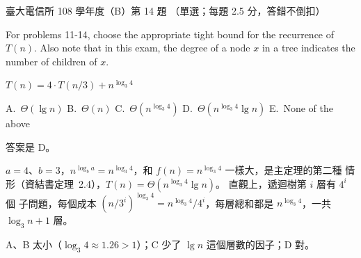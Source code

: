 \begin{pastexam}[label={px:ntu-108-comm-dsab-14}]{臺大電信所 108 學年度（B）第 14 題}
（單選；每題 2.5 分，答錯不倒扣）

For problems 11-14, choose the appropriate tight bound for the recurrence of $T(n)$. Also note
that in this exam, the degree of a node $x$ in a tree indicates the number of children of $x$.

$T(n)=4\cdot T(n/3)+n^{\log_3 4}$

A.~$\Theta(\lg n)$ \qquad B.~$\Theta(n)$ \qquad C.~$\Theta(n^{\log_3 4})$ \qquad
D.~$\Theta(n^{\log_3 4}\lg n)$ \qquad E.~None of the above
\end{pastexam}

\begin{pastsoln}
答案是 D。

$a = 4$、$b = 3$，$n^{\log_b a} = n^{\log_3 4}$，和 $f(n) = n^{\log_3 4}$ 一樣大，是主定理的第二種
情形（資結書定理~2.4），$T(n) = \Theta(n^{\log_3 4} \lg n)$。 直觀上，遞迴樹第 $i$ 層有 $4^i$ 個
子問題，每個成本 $(n/3^i)^{\log_3 4} = n^{\log_3 4} / 4^i$，每層總和都是 $n^{\log_3 4}$，一共
$\log_3 n + 1$ 層。

A、B 太小（$\log_3 4 \approx 1.26 > 1$）；C 少了 $\lg n$ 這個層數的因子；D 對。
\end{pastsoln}
